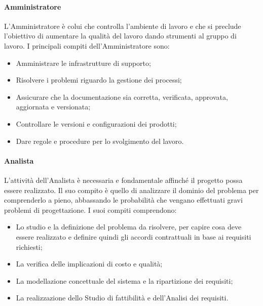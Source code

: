                 \paragraph{Amministratore}
                    L'Amministratore è colui che controlla l'ambiente di lavoro e che si preclude l'obiettivo di aumentare la qualità del lavoro dando strumenti al gruppo di lavoro.
                    I principali compiti dell'Amministratore sono:
                    \begin{itemize}
                        \item Amministrare le infrastrutture di supporto;
                        \item Risolvere i problemi riguardo la gestione dei processi;
                        \item Assicurare che la documentazione sia corretta, verificata, approvata, aggiornata e versionata;
                        \item Controllare le versioni e configurazioni dei prodotti;
                        \item Dare regole e procedure per lo svolgimento del lavoro.
                    \end{itemize}
                \paragraph{Analista}
                    L’attività dell'Analista è necessaria e fondamentale affinché il progetto possa essere realizzato. Il suo compito è quello di analizzare il dominio del problema per comprenderlo a pieno, abbassando le probabilità che vengano effettuati gravi problemi di progettazione. I suoi compiti comprendono:
                    \begin{itemize}
                        \item Lo studio e la definizione del problema da risolvere, per capire cosa deve essere realizzato e definire quindi gli accordi contrattuali in base ai requisiti richiesti;
                        \item La verifica delle implicazioni di costo e qualità;
                        \item La modellazione concettuale del sistema e la ripartizione dei requisiti;
                        \item La realizzazione dello Studio di fattibilità e dell’Analisi dei requisiti.
                    \end{itemize}
